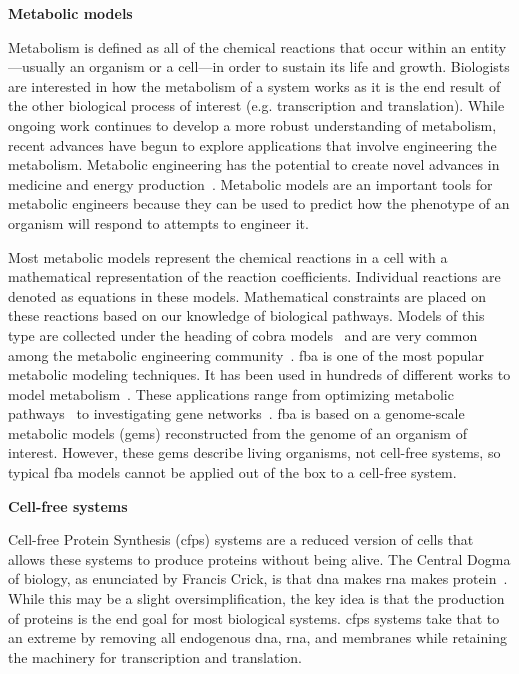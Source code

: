 \textbf{Metabolic models}

Metabolism is defined as all of the chemical reactions that occur within an entity---usually an organism or a cell---in order to sustain its life and growth.
Biologists are interested in how the metabolism of a system works as it is the end result of the other biological process of interest (e.g. transcription and translation).
While ongoing work continues to develop a more robust understanding of metabolism, recent advances have begun to explore applications that involve engineering the metabolism. 
Metabolic engineering has the potential to create novel advances in medicine and energy production~\cite{keasling2012synthetic}.
Metabolic models are an important tools for metabolic engineers because they can be used to predict how the phenotype of an organism will respond to attempts to engineer it.

Most metabolic models represent the chemical reactions in a cell with a mathematical representation of the reaction coefficients.
Individual reactions are denoted as equations in these models.
Mathematical constraints are placed on these reactions based on our knowledge of biological pathways.
Models of this type are collected under the heading of \gls{cobra} models~\cite{schellenberger2011quantitative} and are very common among the metabolic engineering community~\cite{orth2010flux}.
\gls{fba} is one of the most popular metabolic modeling techniques.
It has been used in hundreds of different works to model metabolism~\cite{feist2008growing}.
These applications range from optimizing metabolic pathways~\cite{almaas2004global} to investigating gene networks~\cite{shlomi2007genome}.
\gls{fba} is based on a genome-scale metabolic models (\glspl{gem}) reconstructed from the genome of an organism of interest.
However, these \glspl{gem} describe living organisms, not cell-free systems, so typical \gls{fba} models cannot be applied out of the box to a cell-free system.

\textbf{Cell-free systems}

Cell-free Protein Synthesis (\gls{cfps}) systems are a reduced version of cells that allows these systems to produce proteins without being alive.
The Central Dogma of biology, as enunciated by Francis Crick, is that \gls{dna} makes \gls{rna} makes protein~\cite{crick1970central}.
While this may be a slight oversimplification, the key idea is that the production of proteins is the end goal for most biological systems.
\gls{cfps} systems take that to an extreme by removing all endogenous \gls{dna}, \gls{rna}, and membranes while retaining the machinery for transcription and translation.

